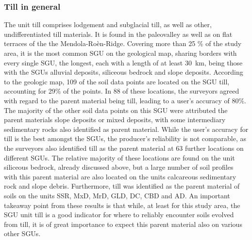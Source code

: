\documentclass[preprint,12pt,authoryear]{elsarticle}
\begin{document}
\subsubsection{Till in general}
The unit till comprises lodgement and subglacial till, as well as other, undifferentiated till materials. It is found in the paleovalley as well as on flat terraces of the the Mendola-Ro\`en-Ridge.   Covering more than 25 \% of the study area, it is the most common SGU on the geological map, sharing borders with every single SGU, the longest, each with a length of at least 30~km, being those with the SGUs alluvial deposits,  siliceous bedrock and slope deposits. According to the geologic map, 109 of the soil data points are located on the SGU till, accounting for 29\% of the points. In 88 of these locations, the surveyors agreed with regard to the parent material being till, leading to a user's accuracy of 80\%. The majority of the other soil data points on this SGU were attributed the parent materials slope deposits or  mixed deposits, with some intermediary sedimentary rocks also identified as parent material. While the user's accuracy for till is the best amongst the SGUs, the producer's reliability is not comparable, as the surveyors also identified till as the parent material at 63 further locations on different SGUs. The relative majority of these locations are found on the unit siliceous bedrock, already discussed above, but a large number of soil profiles with this parent material are also located on the units calcareous sedimentary rock and slope debris. Furthermore, till was identified as the parent material of soils on the units SSR, MxD, MrD, GLD, DC, CBD and AD. An important takeaway point from these results is that while, at least for this study area, the SGU unit till is a good indicator for where to reliably encounter soils evolved from till, it is of great importance to expect this  parent material also on various other SGUs.
\end{document}
